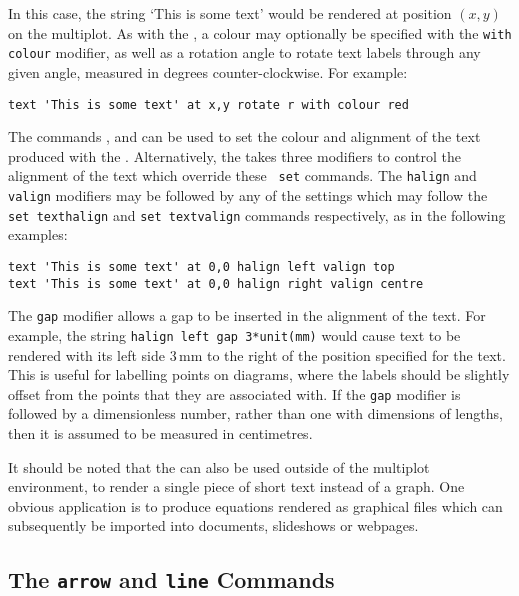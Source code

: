 In this case, the string `This is some text' would be rendered at position
$(x,y)$ on the multiplot. As with the , a colour may
optionally be specified with the {\tt with colour} modifier, as well as a
rotation angle to rotate text labels through any given angle, measured in
degrees counter-clockwise. For example:

\begin{verbatim}
text 'This is some text' at x,y rotate r with colour red
\end{verbatim}

The commands ,  and
 can be used to set the colour and alignment of the
text produced with the . Alternatively, the  takes
three modifiers to control the alignment of the text which override these {\tt
set} commands. The {\tt halign} and {\tt valign} modifiers may be followed by
any of the settings which may follow the {\tt set texthalign} and {\tt set
textvalign} commands respectively, as in the following examples:

\begin{verbatim}
text 'This is some text' at 0,0 halign left valign top
text 'This is some text' at 0,0 halign right valign centre
\end{verbatim}

\noindent The {\tt gap} modifier allows a gap to be inserted in the alignment
of the text. For example, the string {\tt halign left gap 3*unit(mm)} would
cause text to be rendered with its left side $3\,\mathrm{mm}$ to the right of
the position specified for the text. This is useful for labelling points on
diagrams, where the labels should be slightly offset from the points that they
are associated with. If the {\tt gap} modifier is followed by a dimensionless
number, rather than one with dimensions of lengths, then it is assumed to be
measured in centimetres.

It should be noted that the  can also be used outside of the
multiplot environment, to render a single piece of short text instead of a
graph. One obvious application is to produce equations rendered as graphical
files which can subsequently be imported into documents, slideshows or
webpages.

\subsection{The {\tt arrow} and {\tt line} Commands}

